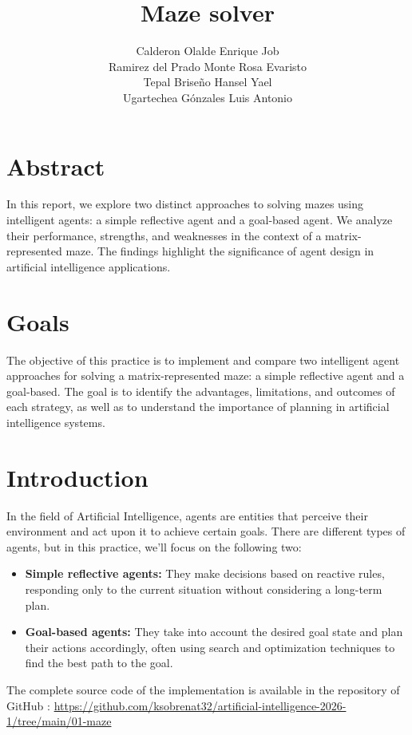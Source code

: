 \documentclass[letterpaper,12pt,oneside]{article}
\author{Calderon Olalde Enrique Job \\
Ramirez del Prado Monte Rosa Evaristo \\
Tepal Briseño Hansel Yael \\
Ugartechea Gónzales Luis Antonio
}
\title{Maze solver}
\begin{document}
\maketitle

\section{Abstract}
In this report, we explore two distinct approaches to solving mazes using intelligent agents: a simple reflective agent and a goal-based agent. We analyze their performance, strengths, and weaknesses in the context of a matrix-represented maze. The findings highlight the significance of agent design in artificial intelligence applications.

\section{Goals}

The objective of this practice is to implement and compare two intelligent agent approaches for solving a matrix-represented maze: a simple reflective agent and a goal-based. The goal is to identify the advantages, limitations, and outcomes of each strategy, as well as to understand the importance of planning in artificial intelligence systems.

\section{Introduction}

In the field of Artificial Intelligence, agents are entities that perceive their environment and act upon it to achieve certain goals. There are different types of agents, but in this practice, we'll focus on the following two:

\begin{itemize}
    \item \textbf{Simple reflective agents:} They make decisions based on reactive rules, responding only to the current situation without considering a long-term plan.
    \item \textbf{Goal-based agents:} They take into account the desired goal state and plan their actions accordingly, often using search and optimization techniques to find the best path to the goal.
\end{itemize}

The complete source code of the implementation is available in the repository of GitHub : \url{https://github.com/ksobrenat32/artificial-intelligence-2026-1/tree/main/01-maze}
\end{document}
